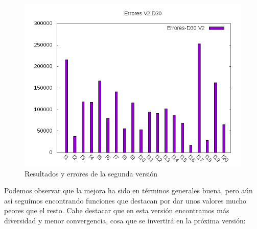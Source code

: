 \documentclass[12pt,a4paper]{article}
\begin{document}
\begin{figure}[!h]
		\includegraphics[scale=0.5]{../Algoritmo/resultados/Imagenes/Errores/errores_v2_d30.png}
		\caption{Resultados y errores de la segunda versión}
	\end{figure}

	Podemos observar que la mejora ha sido en términos generales buena, pero aún así seguimos encontrando funciones que destacan por dar unos valores mucho peores que el resto. Cabe destacar que en esta versión encontramos más diversidad y menor convergencia, cosa que se invertirá en la próxima versión:
	
\end{document}
